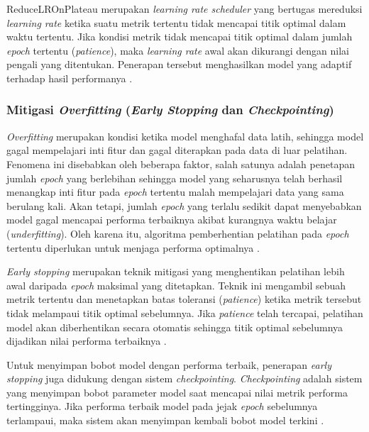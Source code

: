 ReduceLROnPlateau merupakan \textit{learning rate scheduler} yang bertugas mereduksi \textit{learning rate} ketika suatu metrik tertentu tidak mencapai titik optimal dalam waktu tertentu.
Jika kondisi metrik tidak mencapai titik optimal dalam jumlah \textit{epoch} tertentu (\textit{patience}), maka \textit{learning rate} awal akan dikurangi dengan nilai pengali yang ditentukan. 
Penerapan tersebut menghasilkan model yang adaptif terhadap hasil performanya \cite{paszke2019pytorch}. \par

\subsubsection{Mitigasi \textit{Overfitting} (\textit{Early Stopping} dan \textit{Checkpointing})} \label{II.Teori10.4}
\textit{Overfitting} merupakan kondisi ketika model menghafal data latih, sehingga model gagal mempelajari inti fitur dan gagal diterapkan pada data di luar pelatihan. 
Fenomena ini disebabkan oleh beberapa faktor, salah satunya adalah penetapan jumlah \textit{epoch} yang berlebihan sehingga model yang seharusnya telah berhasil menangkap inti fitur pada \textit{epoch} tertentu malah mempelajari data yang sama berulang kali.
Akan tetapi, jumlah \textit{epoch} yang terlalu sedikit dapat menyebabkan model gagal mencapai performa terbaiknya akibat kurangnya waktu belajar (\textit{underfitting}).
Oleh karena itu, algoritma pemberhentian pelatihan pada \textit{epoch} tertentu diperlukan untuk menjaga performa optimalnya \cite{goodfellow2016deep}. \par

\textit{Early stopping} merupakan teknik mitigasi yang menghentikan pelatihan lebih awal daripada \textit{epoch} maksimal yang ditetapkan. 
Teknik ini mengambil sebuah metrik tertentu dan menetapkan batas toleransi (\textit{patience}) ketika metrik tersebut tidak melampaui titik optimal sebelumnya. 
Jika \textit{patience} telah tercapai, pelatihan model akan diberhentikan secara otomatis sehingga titik optimal sebelumnya dijadikan nilai performa terbaiknya \cite{prechelt1998early}. \par

Untuk menyimpan bobot model dengan performa terbaik, penerapan \textit{early stopping} juga didukung dengan sistem \textit{checkpointing}. 
\textit{Checkpointing} adalah sistem yang menyimpan bobot parameter model saat mencapai nilai metrik performa tertingginya. 
Jika performa terbaik model pada jejak \textit{epoch} sebelumnya terlampaui, maka sistem akan menyimpan kembali bobot model terkini \cite{goodfellow2016deep}. \par

